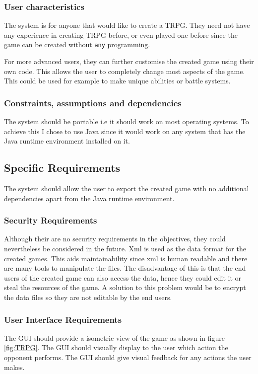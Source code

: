 \subsubsection{User characteristics}
The system is for anyone that would like to create a TRPG.  They need not have any experience in creating TRPG before, or even played one before since the game can be created without \texttt{any} programming. 

For more advanced users, they can further customise the created game using their own code. This allows the user to completely change most aspects of the game. This could be used for example to make unique abilities or battle systems.


\subsubsection{Constraints, assumptions and dependencies}
The system should be portable i.e it should work on most operating systems.  To achieve this I chose to use Java  since it would work on any system that has the Java runtime environment installed on it. 



\subsection{Specific Requirements}
The system should allow the user to export the created game with no additional dependencies apart from the Java runtime environment. 

\subsubsection{Security Requirements}
Although their are no security requirements in the objectives, they could nevertheless  be considered in the future. Xml is used as the data format for the created games. This aids maintainability since xml is human readable and there are many tools to manipulate the files. The disadvantage of this is that the end users of the created game can also access the data, hence they could edit it or steal the resources of the game. A solution to this problem would be to encrypt the data files so they are not editable by the end users.    

\subsubsection{User Interface Requirements}
The GUI should provide a isometric view of the game as shown in figure \ref{fig:TRPG}. The GUI should visually display to the user  which action the opponent performs. The GUI should give visual feedback for any actions the user makes.



